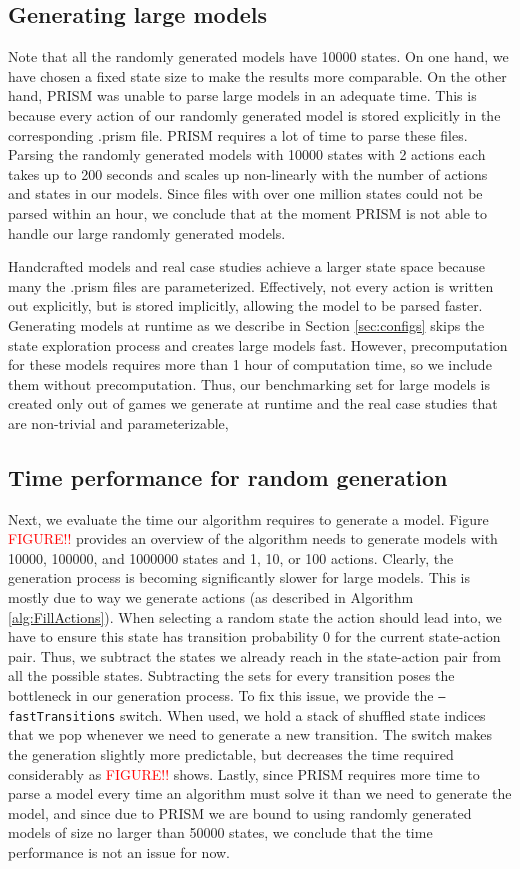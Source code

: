 \subsection{Generating large models} \label{subsec:largeModels}
Note that all the randomly generated models have 10000 states. On one hand, we have chosen a fixed state size to make the results more comparable.
On the other hand, PRISM was unable to parse large models in an adequate time.
This is because every action of our randomly generated model is stored explicitly in the corresponding .prism file.
PRISM requires a lot of time to parse these files. Parsing the randomly generated models with 10000 states with 2 actions each takes
up to 200 seconds and scales up non-linearly with the number of actions and states in our models.
Since files with over one million states could not be parsed within an hour, we conclude that at the moment PRISM is not able to handle our large randomly generated models.

Handcrafted models and real case studies achieve a larger state space because many the .prism files are parameterized.
Effectively, not every action is written out explicitly, but is stored implicitly, allowing the model to be parsed faster.
Generating models at runtime as we describe in Section \ref{sec:configs} skips the state exploration process and 
creates large models fast. However, precomputation for these models requires more than 1 hour of computation time, so we include them without precomputation. 
Thus, our benchmarking set for large models is created only out of games we generate at runtime and the real case studies that are non-trivial and parameterizable, 

\subsection{Time performance for random generation}
Next, we evaluate the time our algorithm requires to generate a model. 
Figure \textcolor{red}{FIGURE!!} provides an overview of the algorithm needs to generate models with 10000, 100000, and 1000000 states and 1, 10, or 100 actions.
Clearly, the generation process is becoming significantly slower for large models. This is mostly due to way we generate actions (as described in Algorithm \ref{alg:FillActions}). 
When selecting a random state the action should lead into, we have to ensure this state has transition probability 0 for the current state-action pair. 
Thus, we subtract the states we already reach in the state-action pair from all the possible states. 
Subtracting the sets for every transition poses the bottleneck in our generation process.
To fix this issue, we provide the \texttt{--fastTransitions} switch. 
When used, we hold a stack of shuffled state indices that we pop whenever we need to generate a new transition. 
The switch makes the generation slightly more predictable, but decreases the time required considerably as \textcolor{red}{FIGURE!!} shows.
Lastly, since PRISM requires more time to parse a model every time an algorithm must solve it than we need to generate the model, 
and since due to PRISM we are bound to using randomly generated models of size no larger than 50000 states, 
we conclude that the time performance is not an issue for now.

